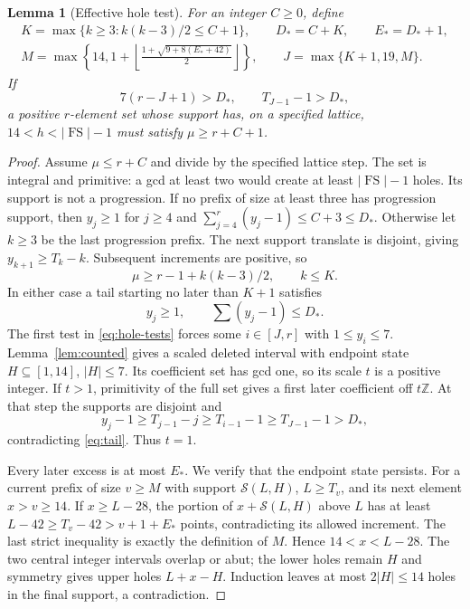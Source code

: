 \documentclass[11pt,a4paper]{article}
\newcommand{\FS}{\operatorname{FS}}
\newcommand{\Z}{\mathbb Z}
\newtheorem{lemma}[theorem]{Lemma}
\begin{document}
\begin{lemma}[Effective hole test]\label{lem:effective}
For an integer $C\ge0$, define
\begin{gather*}
 K=\max\{k\ge3:k(k-3)/2\le C+1\},\qquad D_*=C+K,
 \qquad E_*=D_*+1,\\
 M=\max\left\{14,1+\left\lfloor
 \frac{1+\sqrt{9+8(E_*+42)}}2\right\rfloor\right\},
 \qquad J=\max\{K+1,19,M\}.
\end{gather*}
If
\begin{equation}\label{eq:hole-tests}
 7(r-J+1)>D_*,\qquad T_{J-1}-1>D_*,
\end{equation}
a positive $r$-element set whose support has, on a specified lattice,
$14<h<|\FS|-1$ must satisfy $\mu\ge r+C+1$.
\end{lemma}
\begin{proof}
Assume $\mu\le r+C$ and divide by the specified lattice step.
The set is integral and primitive: a gcd at least two would create at
least $|\FS|-1$ holes. Its support is not a progression.
If no prefix of size at least three has progression support, then
$y_j\ge1$ for $j\ge4$ and $\sum_{j=4}^r(y_j-1)\le C+3\le D_*$.
Otherwise let $k\ge3$ be the last progression prefix. The next support
translate is disjoint, giving $y_{k+1}\ge T_k-k$. Subsequent increments
are positive, so
\[
 \mu\ge r-1+k(k-3)/2,\qquad k\le K.
\]
In either case a tail starting no later than $K+1$ satisfies
\begin{equation}\label{eq:tail}
 y_j\ge1,\qquad \sum(y_j-1)\le D_*.
\end{equation}
The first test in \eqref{eq:hole-tests} forces some $i\in[J,r]$ with
$1\le y_i\le7$. Lemma~\ref{lem:counted} gives a scaled deleted interval
with endpoint state $H\subseteq[1,14]$, $|H|\le7$. Its coefficient set
has gcd one, so its scale $t$ is a positive integer. If $t>1$, primitivity
of the full set gives a first later coefficient off $t\Z$. At that step
the supports are disjoint and
\[
 y_j-1\ge T_{j-1}-j\ge T_{i-1}-1\ge T_{J-1}-1>D_*,
\]
contradicting \eqref{eq:tail}. Thus $t=1$.

Every later excess is at most $E_*$. We verify that the endpoint state
persists. For a current prefix of size $v\ge M$ with support
$\mathcal S(L,H)$, $L\ge T_v$, and its next element $x>v\ge14$.
If $x\ge L-28$, the portion of $x+\mathcal S(L,H)$ above $L$ has at
least $L-42\ge T_v-42>v+1+E_*$ points, contradicting its allowed
increment. The last strict inequality is exactly the definition of $M$.
Hence $14<x<L-28$. The two central integer intervals overlap or abut;
the lower holes remain $H$ and symmetry gives upper holes $L+x-H$.
Induction leaves at most $2|H|\le14$ holes in the final support, a contradiction.
\end{proof}
\end{document}
